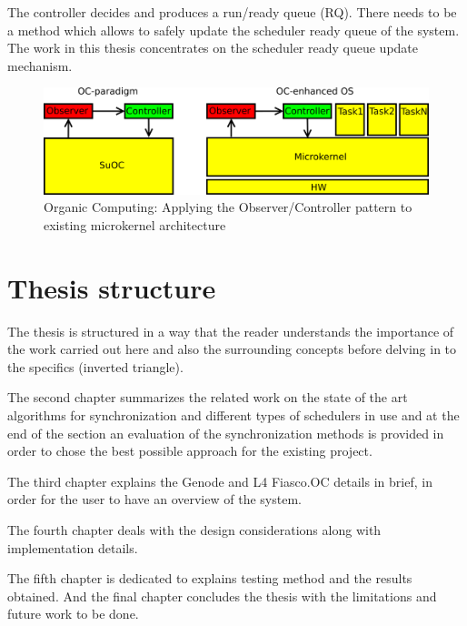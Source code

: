 The controller decides and produces a run/ready queue (RQ). There needs to be a method which allows to safely update the scheduler ready queue of the system. The work in this thesis concentrates on the scheduler ready queue update mechanism.

\begin{figure}[h][architecture]
  \centering
  \includegraphics[scale = 0.5]{figures/microkernel_architecture.png}
  \caption{Organic Computing: Applying the Observer/Controller pattern to existing microkernel architecture \cite{kia4sm}}\label{architeture}
\end{figure}

\section{Thesis structure}
The thesis is structured in a way that the reader understands the importance of the work carried out here and also the surrounding concepts before delving in to the specifics (inverted triangle). 

The second chapter summarizes the related work on the state of the art algorithms for synchronization and different types of schedulers in use and at the end of the section an evaluation of the synchronization methods is provided in order to chose the best possible approach for the existing project.

The third chapter explains the Genode and L4 Fiasco.OC details in brief, in order for the user to have an overview of the system. 

The fourth chapter deals with the design considerations along with implementation details.

The fifth chapter is dedicated to explains testing method and the results obtained.
And the final chapter concludes the thesis with the limitations and future work to be done. 